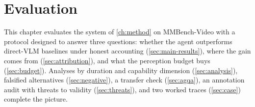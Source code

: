%
%

\chapter{Evaluation}
\label{ch:eval}

This chapter evaluates the system of \cref{ch:method} on MMBench-Video with a
protocol designed to answer three questions: whether the agent outperforms
direct-VLM baselines under honest accounting (\cref{sec:main-results}), where the
gain comes from (\cref{sec:attribution}), and what the perception budget buys
(\cref{sec:budget}). Analyses by duration and capability dimension
(\cref{sec:analysis}), falsified alternatives (\cref{sec:negative}), a transfer
check (\cref{sec:agqa}), an annotation audit with threats to validity
(\cref{sec:threats}), and two worked traces (\cref{sec:case}) complete the picture.

